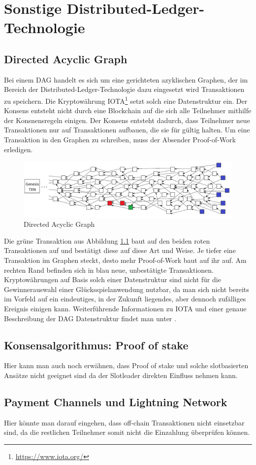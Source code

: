 \chapter{Sonstige Distributed-Ledger-Technologie}
\section{Directed Acyclic Graph}
Bei einem DAG handelt es sich um eine gerichteten azyklischen Graphen, der im Bereich der  Distributed-Ledger-Technologie dazu eingesetzt wird Transaktionen zu speichern.
Die Kryptowährung IOTA\footnote{\url{https://www.iota.org/}} setzt solch eine Datenstruktur ein. Der Konsens entsteht nicht durch eine Blockchain auf die sich alle Teilnehmer mithilfe der Konsnensregeln einigen. Der Konsens entsteht dadurch, dass Teilnehmer neue Transaktionen nur auf Transaktionen aufbauen, die sie für gültig halten. Um eine Transaktion in den Graphen zu schreiben, muss der Absender Proof-of-Work erledigen. 

\begin{figure}[H]
\centering
\includegraphics[width=1\linewidth]{Figures/tangle}
\decoRule
\caption{Directed Acyclic Graph}
\label{fig:tangle}
\end{figure}

Die grüne Transaktion aus Abbildung \ref{fig:tangle} baut auf den beiden roten Transaktionen auf und bestätigt diese auf diese Art und Weise. Je tiefer eine Transaktion im Graphen steckt, desto mehr Proof-of-Work baut auf ihr auf. Am rechten Rand befinden sich in blau neue, unbestätigte Transaktionen.
Kryptowährungen auf Basis solch einer Datenstruktur sind nicht für die Gewinnerauswahl einer Glücksspielanwendung nutzbar, da man sich nicht bereits im Vorfeld auf ein eindeutiges, in der Zukunft liegendes, aber dennoch zufälliges Ereignis einigen kann. Weiterführende Informationen zu IOTA und einer genaue Beschreibung der DAG Datenstruktur findet man unter \citep{tangle_whitepaper}.
\section{Konsensalgorithmus: Proof of stake }\label{pos}
Hier kann man auch noch erwähnen, dass Proof of stake und solche slotbasierten Ansätze nicht geeignet sind da der Slotleader direkten Einfluss nehmen kann.
\section{Payment Channels und Lightning Network}
Hier könnte man darauf eingehen, dass off-chain Transaktionen nicht einsetzbar sind, da die restlichen Teilnehmer somit nicht die Einzahlung überprüfen können.